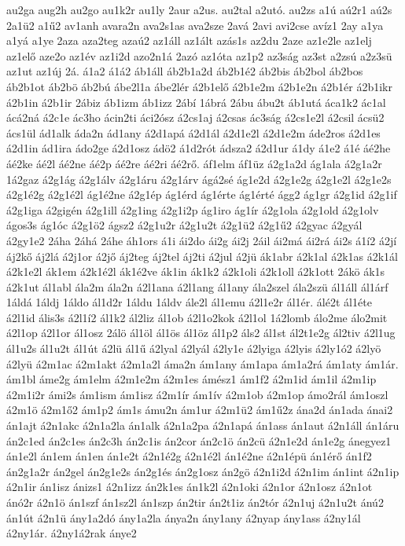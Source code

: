 {au2ga
aug2h
au2go
au1k2r
au1ly
2aur
a2us.
au2tal
a2utó.
au2zs
a1ú
aú2r1
aú2s
2a1ü2
a1ű2
av1anh
avara2n
ava2s1as
ava2sze
2avá
2avi
avi2cse
avíz1
2ay
a1ya
a1yá
a1ye
2aza
aza2teg
azaú2
az1áll
az1ált
azás1s
az2du
2aze
az1e2le
az1elj
az1elő
aze2o
az1év
az1i2d
azo2n1á
2azó
az1óta
az1p2
az3ság
az3st
a2zsú
a2z3sü
az1ut
az1új
2á.
á1a2
á1á2
áb1áll
áb2b1a2d
áb2b1é2
áb2bis
áb2bol
áb2bos
áb2b1ot
áb2bö
áb2bú
ábe2l1a
ábe2lér
á2b1elő
á2b1e2m
á2b1e2n
á2b1ér
á2b1ikr
á2b1in
á2b1ir
2ábiz
áb1izm
áb1izz
2ábí
1ábrá
2ábu
ábu2t
áb1utá
áca1k2
ác1al
ácá2ná
á2c1e
ác3ho
ácin2ti
áci2ósz
á2cs1aj
á2csas
ác3ság
á2cs1e2l
á2csil
ácsü2
ács1ül
ád1alk
áda2n
ád1any
á2d1apá
á2d1ál
á2d1e2l
á2d1e2m
áde2ros
á2d1es
á2d1in
ád1ira
ádo2ge
á2d1osz
ádö2
á1d2rót
ádsza2
á2d1ur
á1dy
á1e2
á1é
áé2he
áé2ke
áé2l
áé2ne
áé2p
áé2re
áé2ri
áé2rő.
áf1elm
áf1üz
á2g1a2d
ág1ala
á2g1a2r
1á2gaz
á2g1ág
á2g1álv
á2g1áru
á2g1árv
ágá2sé
ág1e2d
á2g1e2g
á2g1e2l
á2g1e2s
á2g1é2g
á2g1é2l
ág1é2ne
á2g1ép
ág1érd
ág1érte
ág1érté
ágg2
ág1gr
á2g1id
á2g1if
á2g1iga
á2gigén
á2g1ill
á2g1ing
á2g1i2p
ág1iro
ág1ír
á2g1ola
á2g1old
á2g1olv
ágos3s
ág1óc
á2g1ö2
ágsz2
á2g1u2r
á2g1u2t
á2g1ü2
á2g1ű2
á2gyac
á2gyál
á2gy1e2
2áha
2áhá
2áhe
áh1ors
á1i
ái2do
ái2g
ái2j
2áil
ái2má
ái2rá
ái2s
á1í2
á2jí
áj2kő
áj2lá
á2j1or
á2jő
áj2teg
áj2tel
áj2ti
á2jul
á2jü
ák1abr
á2k1al
á2k1as
á2k1ál
á2k1e2l
ák1em
á2k1é2l
ák1é2ve
ák1in
ák1k2
á2k1oli
á2k1oll
á2k1ott
2ákö
ák1s
á2k1ut
ál1abl
ála2m
ála2n
á2l1ana
á2l1ang
ál1any
ála2szel
ála2szü
ál1áll
ál1árf
1áldá
1áldj
1áldo
ál1d2r
1áldu
1áldv
ále2l
ál1emu
á2l1e2r
ál1ér.
álé2t
ál1éte
á2l1id
ális3s
á2l1í2
ál1k2
ál2liz
ál1ob
á2l1o2kok
á2l1ol
1á2lomb
álo2me
álo2mit
á2l1op
á2l1or
ál1osz
2álö
ál1öl
ál1ös
ál1öz
ál1p2
áls2
ál1st
ál2t1e2g
ál2tiv
á2l1ug
ál1u2s
ál1u2t
ál1út
á2lü
ál1ű
á2lyal
á2lyál
á2ly1e
á2lyiga
á2lyis
á2ly1ó2
á2lyö
á2lyü
á2m1ac
á2m1akt
á2m1a2l
áma2n
ám1any
ám1apa
ám1a2rá
ám1aty
ám1ár.
ám1bl
áme2g
ám1elm
á2m1e2m
á2m1es
ámész1
ám1f2
á2m1id
ám1il
á2m1ip
á2m1i2r
ámi2s
ám1ism
ám1isz
á2m1ír
ám1ív
á2m1ob
á2m1op
ámo2rál
ám1oszl
á2m1ö
á2m1ő2
ám1p2
ám1s
ámu2n
ám1ur
á2m1ü2
ám1ű2z
ána2d
án1ada
ánai2
án1ajt
á2n1akc
á2n1a2la
án1alk
á2n1a2pa
á2n1apá
án1ass
án1aut
á2n1áll
án1áru
án2c1ed
án2c1es
án2c3h
án2c1is
án2cor
án2c1ö
án2cü
á2n1e2d
án1e2g
ánegyez1
án1e2l
án1em
án1en
án1e2t
á2n1é2g
á2n1é2l
án1é2ne
á2n1épü
án1érő
án1f2
án2g1a2r
án2gel
án2g1e2s
án2g1és
án2g1osz
án2gö
á2n1i2d
á2n1im
án1int
á2n1ip
á2n1ir
án1isz
ánizs1
á2n1izz
án2k1es
án1k2l
á2n1oki
á2n1or
á2n1osz
á2n1ot
ánó2r
á2n1ö
án1szf
án1sz2l
án1szp
án2tir
án2t1iz
án2tór
á2n1uj
á2n1u2t
ánú2
án1út
á2n1ü
ány1a2dó
ány1a2la
ánya2n
ány1any
á2nyap
ány1ass
á2ny1ál
á2ny1ár.
á2ny1á2rak
ánye2
}
